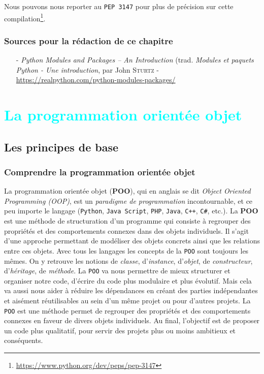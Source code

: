 \documentclass[a4paper,12pt]{book}
\begin{document}
Nous pouvons nous reporter au \texttt{PEP 3147} pour plus de précision sur cette compilation\footnote{\url{https://www.python.org/dev/peps/pep-3147}}.
\medskip

\section*{Sources pour la rédaction de ce chapitre}
\begin{itemize}
	\item[-] \textit{Python Modules and Packages – An Introduction} (trad. \textit{Modules et paquets Python - Une introduction}, par John \textsc{Sturtz} - \url{https://realpython.com/python-modules-packages/}
\end{itemize}
\medskip

\part{\textcolor{cyan}{La programmation orientée objet}}
\chapter{Les principes de base}\label{POO}
\section{Comprendre la programmation orientée objet}
La programmation orientée objet (\textbf{POO}), qui en anglais se dit \textit{Object Oriented Programming (OOP)}, est un \textit{paradigme de programmation} incontournable, et ce peu importe le langage (\texttt{Python}, \texttt{Java Script}, \texttt{PHP}, \texttt{Java}, \texttt{C++}, \texttt{C\#}, etc.). La \textbf{POO} est une méthode de structuration d'un programme qui consiste à regrouper des propriétés et des comportements connexes dans des objets individuels. Il s'agit d'une approche permettant de modéliser des objets concrets ainsi que les relations entre ces objets. Avec tous les langages les concepts de la \texttt{POO} sont toujours les mêmes. On y retrouve les notions de \textit{classe}, d'\textit{instance}, d'\textit{objet}, de \textit{constructeur}, d'\textit{héritage}, de \textit{méthode}. La \texttt{POO} va nous permettre de mieux structurer et organiser notre code, d'écrire du code plus modulaire et plus évolutif. Mais cela va aussi nous aider à réduire les dépendances en créant des parties indépendantes et aisément réutilisables au sein d'un même projet ou pour d'autres projets. La \texttt{POO} est une méthode permet de regrouper des propriétés et des comportements connexes en faveur de divers objets individuels. Au final, l'objectif est de proposer un code plus qualitatif, pour servir des projets plus ou moins ambitieux et conséquents.
\medskip
\end{document}
